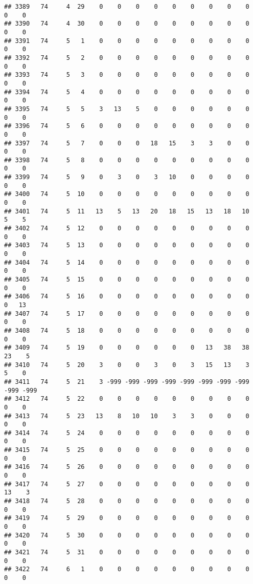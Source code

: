 \documentclass[]{article}
\begin{document}
\begin{verbatim}
## 3389   74     4  29    0    0    0    0    0    0    0    0    0    0    0
## 3390   74     4  30    0    0    0    0    0    0    0    0    0    0    0
## 3391   74     5   1    0    0    0    0    0    0    0    0    0    0    0
## 3392   74     5   2    0    0    0    0    0    0    0    0    0    0    0
## 3393   74     5   3    0    0    0    0    0    0    0    0    0    0    0
## 3394   74     5   4    0    0    0    0    0    0    0    0    0    0    0
## 3395   74     5   5    3   13    5    0    0    0    0    0    0    0    0
## 3396   74     5   6    0    0    0    0    0    0    0    0    0    0    0
## 3397   74     5   7    0    0    0   18   15    3    3    0    0    0    0
## 3398   74     5   8    0    0    0    0    0    0    0    0    0    0    0
## 3399   74     5   9    0    3    0    3   10    0    0    0    0    0    0
## 3400   74     5  10    0    0    0    0    0    0    0    0    0    0    0
## 3401   74     5  11   13    5   13   20   18   15   13   18   10    5    5
## 3402   74     5  12    0    0    0    0    0    0    0    0    0    0    0
## 3403   74     5  13    0    0    0    0    0    0    0    0    0    0    0
## 3404   74     5  14    0    0    0    0    0    0    0    0    0    0    0
## 3405   74     5  15    0    0    0    0    0    0    0    0    0    0    0
## 3406   74     5  16    0    0    0    0    0    0    0    0    0    0   13
## 3407   74     5  17    0    0    0    0    0    0    0    0    0    0    0
## 3408   74     5  18    0    0    0    0    0    0    0    0    0    0    0
## 3409   74     5  19    0    0    0    0    0    0   13   38   38   23    5
## 3410   74     5  20    3    0    0    3    0    3   15   13    3    5    0
## 3411   74     5  21    3 -999 -999 -999 -999 -999 -999 -999 -999 -999 -999
## 3412   74     5  22    0    0    0    0    0    0    0    0    0    0    0
## 3413   74     5  23   13    8   10   10    3    3    0    0    0    0    0
## 3414   74     5  24    0    0    0    0    0    0    0    0    0    0    0
## 3415   74     5  25    0    0    0    0    0    0    0    0    0    0    0
## 3416   74     5  26    0    0    0    0    0    0    0    0    0    0    0
## 3417   74     5  27    0    0    0    0    0    0    0    0    0   13    3
## 3418   74     5  28    0    0    0    0    0    0    0    0    0    0    0
## 3419   74     5  29    0    0    0    0    0    0    0    0    0    0    0
## 3420   74     5  30    0    0    0    0    0    0    0    0    0    0    0
## 3421   74     5  31    0    0    0    0    0    0    0    0    0    0    0
## 3422   74     6   1    0    0    0    0    0    0    0    0    0    0    0

\end{verbatim}
\end{document}
